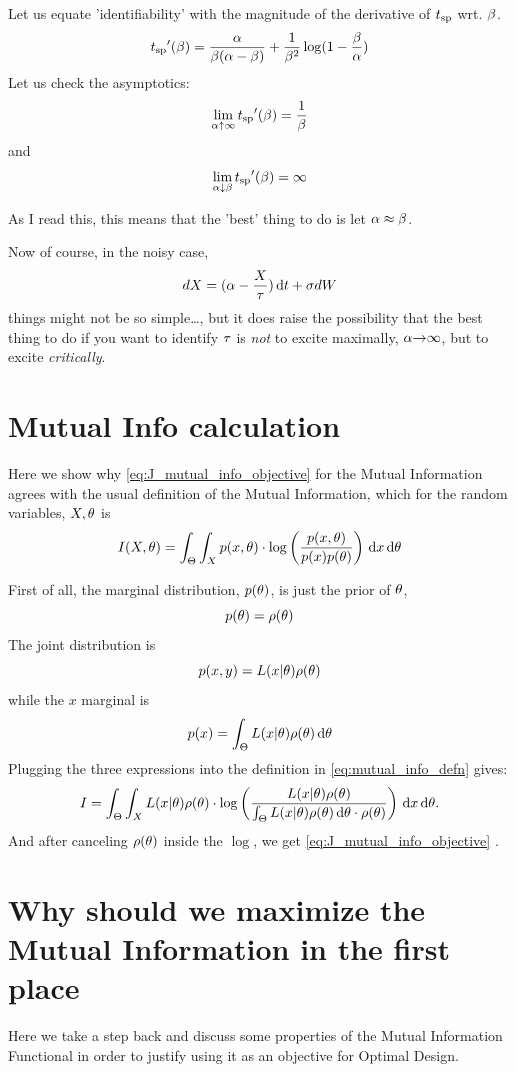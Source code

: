 \documentclass{article}
\begin{document}
Let us equate 'identifiability' with the magnitude of the derivative of ${ t_{\textrm{sp} } }$
wrt. ${\beta}$.
$$
{ t_{\textrm{sp} } }'({\beta}) = \frac{{\alpha}}{{\beta} ( {\alpha} - {\beta})}  + \frac{1}{{\beta}^2}\log(1-\frac{{\beta}}{{\alpha} })   
$$
Let us check the asymptotics:
$$
\lim_{{\alpha} \uparrow \infty} { t_{\textrm{sp} } }'({\beta}) = \frac 1{{\beta}}
$$
and 
$$
\lim_{{\alpha} \downarrow {\beta}} { t_{\textrm{sp} } }'({\beta}) =  \infty
$$
 
As I read this, this means that the 'best' thing to do is let ${\alpha} \approx {\beta}$.

Now of course, in the noisy case, 
$$
dX = ({\alpha} - \frac{X}{{\tau}}) \, \mathrm{d} t + {\sigma } dW 
$$
things might not be so simple\ldots, but it does raise the possibility that the
best thing to do if you want to identify ${\tau}$ is {\itshape not} to excite
maximally, ${\alpha} {\rightarrow} \infty$, but to excite {\itshape critically}.

\section{Mutual Info calculation}
\label{sec:mutual_info_defn} 

Here we show why \cref{eq:J_mutual_info_objective} for the Mutual Information
agrees with the usual definition of the Mutual Information, which for the random variables, $X,{\theta}$ is
\begin{equation}
I(X,{\theta}) = \int_\Theta \int_X p(x,{\theta}) \cdot \log \left(
\frac{p(x,{\theta})}{p(x)p({\theta})}\right) \, \mathrm{d} x \, \mathrm{d} {\theta}
\label{eq:mutual_info_defn}
\end{equation}
 
First of all, the marginal distribution, $p({\theta})$,  is just the prior of ${\theta}$,
$$p({\theta}) = \rho({\theta})$$ The joint distribution is $$p(x,y) = L(x|{\theta})\rho({\theta})$$ while the $x$
marginal is $$p(x) = \int_\Theta L(x|{\theta})\rho({\theta}) \, \mathrm{d} {\theta}$$
Plugging the three expressions into the definition in
\cref{eq:mutual_info_defn} gives:
\begin{equation}
I = \int_\Theta \int_X L(x|{\theta})\rho({\theta}) \cdot 
\log \left( \frac{L(x|{\theta})\rho({\theta}) }{\int_\Theta L(x|{\theta})\rho({\theta}) \, \mathrm{d} {\theta}
\cdot \rho({\theta}) } \right)
\, \mathrm{d} x\, \mathrm{d} {\theta}.
\label{eq:mutual_info_prior_trajectory}
\end{equation}
And after canceling $\rho({\theta})$ inside the $\log$, we get
\cref{eq:J_mutual_info_objective} .


\section{Why should we maximize the Mutual Information in the first place}
Here we take a step back and discuss some properties of the Mutual Information
Functional in order to justify using it as an objective for Optimal Design.
\end{document}
